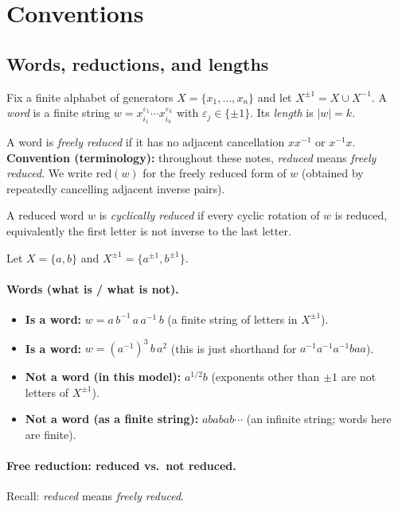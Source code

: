 \documentclass[11pt]{article}
\theoremstyle{definition}
\theoremstyle{plain}
\theoremstyle{remark}
\begin{document}

\section{Conventions}

\subsection{Words, reductions, and lengths}
Fix a finite alphabet of generators $X=\{x_1,\dots,x_n\}$ and let $X^{\pm 1}=X\cup X^{-1}$.
A \emph{word} is a finite string $w=x_{i_1}^{\varepsilon_1}\cdots x_{i_k}^{\varepsilon_k}$ with $\varepsilon_j\in\{\pm1\}$.
Its \emph{length} is $|w|=k$.

A word is \emph{freely reduced} if it has no adjacent cancellation $xx^{-1}$ or $x^{-1}x$.
\textbf{Convention (terminology):} throughout these notes, \emph{reduced} means \emph{freely reduced}.
We write $\mathrm{red}(w)$ for the freely reduced form of $w$ (obtained by repeatedly cancelling adjacent inverse pairs).

A reduced word $w$ is \emph{cyclically reduced} if every cyclic rotation of $w$ is reduced, equivalently the first letter is not inverse to the last letter.

Let $X=\{a,b\}$ and $X^{\pm1}=\{a^{\pm1},b^{\pm1}\}$.

\paragraph{Words (what is / what is not).}
\begin{itemize}[leftmargin=2em]
\item \textbf{Is a word:} $w=a\,b^{-1}\,a\,a^{-1}\,b$ (a finite string of letters in $X^{\pm1}$).
\item \textbf{Is a word:} $w=(a^{-1})^3\,b\,a^2$ (this is just shorthand for $a^{-1}a^{-1}a^{-1} b a a$).
\item \textbf{Not a word (in this model):} $a^{1/2}b$ (exponents other than $\pm1$ are not letters of $X^{\pm1}$).
\item \textbf{Not a word (as a finite string):} $ababab\cdots$ (an infinite string; words here are finite).
\end{itemize}

\paragraph{Free reduction: reduced vs.\ not reduced.}
Recall: \emph{reduced} means \emph{freely reduced}.
\end{document}
